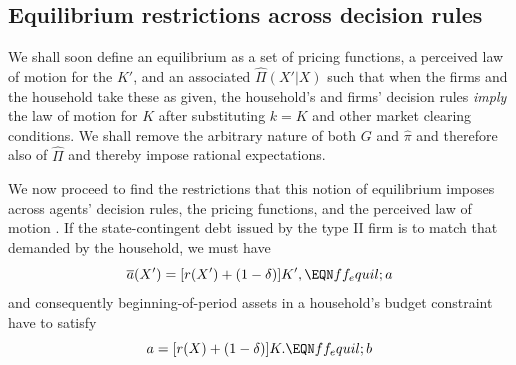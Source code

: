 \subsection{Equilibrium restrictions across decision rules}
We shall soon define an equilibrium as a set of pricing functions,
a perceived law of motion for the $K'$, and an associated
$\hat \Pi(X'| X)$ such that when the firms and the household take
these as given, the household's and firms' decision rules {\it imply\/}
the law of motion for $K$  after substituting $k=K$
and other market clearing conditions.  We shall remove the
arbitrary nature of both $G$ and $\hat \pi$ and therefore
also of $\hat \Pi$ and thereby impose rational expectations.


We now proceed to find the restrictions that this notion of
equilibrium imposes across agents' decision rules, the pricing
functions, and the perceived law of motion . If the
state-contingent debt issued by the type II firm is to match that
demanded by the household, we must have
$$\overline a(X') = [r(X') + (1-\delta)]K', \EQN ff_equil;a $$
and consequently beginning-of-period assets in
a household's budget constraint  have to satisfy
$$a = [r(X) + (1-\delta)]K.           \EQN ff_equil;b
$$


